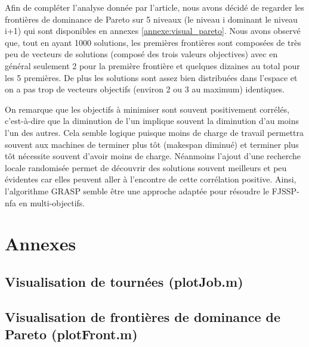 \documentclass[10pt,a4paper]{scrartcl}
\begin{document}
Afin de compléter l'analyse donnée par l'article, nous avons décidé de regarder
les frontières de dominance de Pareto sur 5 niveaux (le niveau i dominant le niveau i+1)
qui sont disponibles en annexes \ref{annexe:visual_pareto}.
Nous avons observé que, tout en ayant 1000 solutions, les premières frontières sont composées de très peu de
vecteurs de solutions (composé des trois valeurs objectives)
 avec en général seulement 2 pour la première frontière et quelques dizaines au total pour les
5 premières. De plus les solutions sont assez bien distribuées dans l'espace et on a pas trop de vecteurs objectifs (environ 2 ou 3 au maximum)
identiques.

On remarque que les objectifs à minimiser sont souvent positivement corrélés, c'est-à-dire que la diminution de l'un implique souvent la diminution d'au moins l'un des autres. Cela semble logique puisque moins de  charge de travail permettra souvent aux machines de terminer plus tôt (makespan diminué) et terminer plus tôt nécessite souvent d'avoir moins de charge.
Néanmoins l'ajout d'une recherche locale randomisée permet de découvrir des solutions souvent meilleurs et peu évidentes car elles peuvent aller à l'encontre de cette corrélation positive. 
Ainsi, l'algorithme GRASP semble être une approche adaptée pour résoudre le FJSSP-nfa en multi-objectifs.


\section{Annexes}

\subsection{Visualisation de tournées (plotJob.m)}


\subsection{Visualisation de frontières de dominance de Pareto (plotFront.m)}

\end{document}
